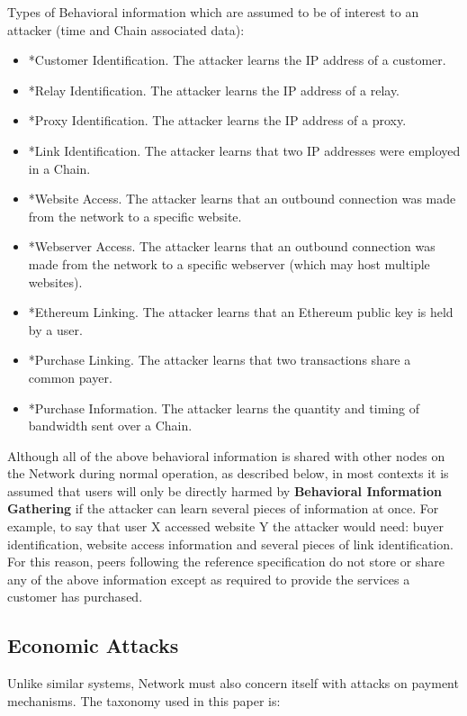 Types of Behavioral information which are assumed to be of interest to an attacker (time and Chain associated data):

\begin{itemize}
\item *Customer Identification. The attacker learns the IP address of a customer.
\item *Relay Identification. The attacker learns the IP address of a relay.
\item *Proxy Identification. The attacker learns the IP address of a proxy.
\item *Link Identification. The attacker learns that two IP addresses were employed in a Chain.
\item *Website Access. The attacker learns that an outbound connection was made from the \Orchid{} network to a specific website.
\item *Webserver Access. The attacker learns that an outbound connection was made from the \Orchid{} network to a specific webserver (which may host multiple websites).
\item *Ethereum Linking. The attacker learns that an Ethereum public key is held by a \Orchid{} user.
\item *Purchase Linking. The attacker learns that two transactions share a common payer.
\item *Purchase Information. The attacker learns the quantity and timing of bandwidth sent over a Chain.
\end{itemize}

Although all of the above behavioral information is shared with other nodes on the \Orchid{} Network during normal operation, as described below, in most contexts it is assumed that users will only be directly harmed by \textbf{Behavioral Information Gathering} if the attacker can learn several pieces of information at once. For example, to say that user X accessed website Y the attacker would need: buyer identification, website access information and several pieces of link identification. For this reason, peers following the reference specification do not store or share any of the above information except as required to provide the services a customer has purchased.

\subsection{Economic Attacks}
\label{econ-attacks}

Unlike similar systems, \Orchid{} Network must also concern itself with attacks on payment mechanisms. The taxonomy used in this paper is:

